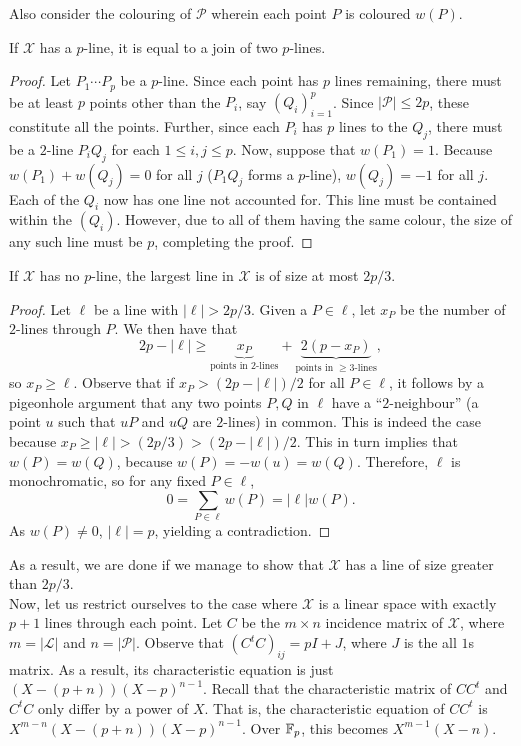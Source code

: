\documentclass{article}
\begin{document}
	Also consider the colouring of $\mathcal{P}$ wherein each point $P$ is coloured $w(P)$.

	\begin{prop}
		If $\mathcal{X}$ has a $p$-line, it is equal to a join of two $p$-lines.
	\end{prop}
	\begin{proof}
		Let $P_1\cdots P_p$ be a $p$-line. Since each point has $p$ lines remaining, there must be at least $p$ points other than the $P_i$, say $(Q_i)_{i=1}^p$. Since $|\mathcal{P}| \le 2p$, these constitute all the points. Further, since each $P_i$ has $p$ lines to the $Q_j$, there must be a $2$-line $P_iQ_j$ for each $1\le i,j \le p$. Now, suppose that $w(P_1) = 1$. Because $w(P_1) + w(Q_j) = 0$ for all $j$ ($P_1 Q_j$ forms a $p$-line), $w(Q_j) = -1$ for all $j$. Each of the $Q_i$ now has one line not accounted for. This line must be contained within the $(Q_i)$. However, due to all of them having the same colour, the size of any such line must be $p$, completing the proof.
	\end{proof}

	\begin{prop}
		If $\mathcal{X}$ has no $p$-line, the largest line in $\mathcal{X}$ is of size at most $2p/3$.
	\end{prop}
	\begin{proof}
		Let $\ell$ be a line with $|\ell| > 2p/3$. Given a $P \in \ell$, let $x_P$ be the number of $2$-lines through $P$. We then have that
		\[ 2p-|\ell| \ge \underbrace{x_P}_{\text{points in $2$-lines}} + \underbrace{2(p-x_P)}_{\text{points in $\ge 3$-lines}}, \]
		so $x_P \ge \ell$. Observe that if $x_P > (2p-|\ell|)/2$ for all $P \in \ell$, it follows by a pigeonhole argument that any two points $P,Q$ in $\ell$ have a ``$2$-neighbour'' (a point $u$ such that $uP$ and $uQ$ are $2$-lines) in common. This is indeed the case because $x_P \ge |\ell| > (2p/3) > (2p-|\ell|)/2$. This in turn implies that $w(P) = w(Q)$, because $w(P) = -w(u) = w(Q)$. Therefore, $\ell$ is monochromatic, so for any fixed $P \in \ell$,
		\[ 0 = \sum_{P \in \ell} w(P) = |\ell| w(P). \]
		As $w(P) \ne 0$, $|\ell| = p$, yielding a contradiction.
	\end{proof}

	As a result, we are done if we manage to show that $\mathcal{X}$ has a line of size greater than $2p/3$.\\

	Now, let us restrict ourselves to the case where $\mathcal{X}$ is a linear space with exactly $p+1$ lines through each point. Let $C$ be the $m \times n$ incidence matrix of $\mathcal{X}$, where $m = |\mathcal{L}|$ and $n = |\mathcal{P}|$. Observe that $(C^tC)_{ij} = pI + J$, where $J$ is the all $1$s matrix. As a result, its characteristic equation is just $(X - (p+n))(X-p)^{n-1}$. Recall that the characteristic matrix of $CC^t$ and $C^tC$ only differ by a power of $X$. That is, the characteristic equation of $CC^t$ is $X^{m-n} (X - (p+n))(X-p)^{n-1}$. Over $\mathbb{F}_p$, this becomes $X^{m-1}(X-n)$.\\
\end{document}
